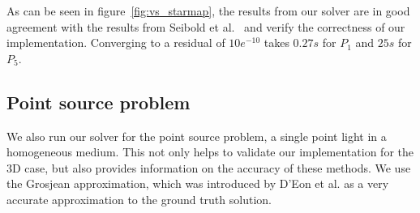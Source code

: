 As can be seen in figure~\ref{fig:vs_starmap}, the results from our solver are in good agreement with the results from Seibold et al.~\cite{Seibold14} and verify the correctness of our implementation. Converging to a residual of $10e^{-10}$ takes $0.27s$ for $P_1$ and $25s$ for $P_5$.

\subsection{Point source problem}

We also run our solver for the point source problem, a single point light in a homogeneous medium. This not only helps to validate our implementation for the 3D case, but also provides information on the accuracy of these methods. We use the Grosjean approximation, which was introduced by D'Eon et al.\cite{dEon11} as a very accurate approximation to the ground truth solution.


